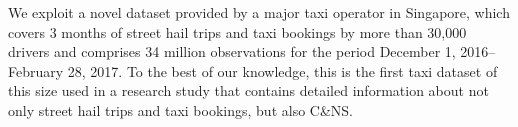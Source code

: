 \documentclass[reviewmode,AEJ]{AEA}
\begin{document}


We exploit a novel dataset provided by a major taxi operator in Singapore,
which covers 3 months of street hail trips and taxi bookings by more than 30,000 drivers and comprises 34
million observations for the period December 1, 2016--February 28, 2017. To the best of our knowledge, 
this is the first taxi dataset of this size used in a research study that contains detailed information 
about not only street hail trips and taxi bookings, but also C\&NS. 
\end{document}
